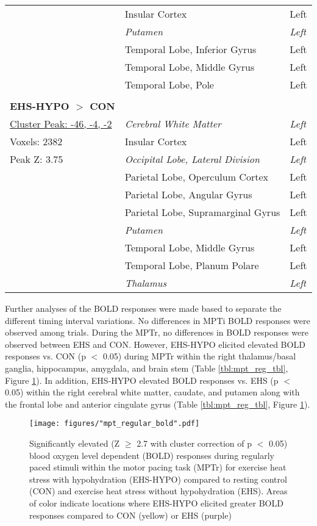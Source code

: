 \begin{table}
\begin{tabular}{lll}
		& Insular Cortex & Left \\
		& \textit{Putamen} & \textit{Left} \\
		& Temporal Lobe, Inferior Gyrus & Left \\
		& Temporal Lobe, Middle Gyrus & Left \\
		& Temporal Lobe, Pole & Left \\
		&& \\
		\textbf{EHS-HYPO ${>}$ CON} & & \\	
		\underline{Cluster Peak: -46, -4, -2} & \textit{Cerebral White Matter} & \textit{Left} \\
		Voxels: 2382 & Insular Cortex & Left \\
		Peak Z: 3.75 & \textit{Occipital Lobe, Lateral Division} & \textit{Left} \\
		& Parietal Lobe, Operculum Cortex & Left \\
		& Parietal Lobe, Angular Gyrus & Left \\ 
		& Parietal Lobe, Supramarginal Gyrus & Left \\
		& \textit{Putamen} & \textit{Left} \\
		& Temporal Lobe, Middle Gyrus & Left \\
		& Temporal Lobe, Planum Polare & Left \\
		& \textit{Thalamus} & \textit{Left} \\
		\hline		    
	\end{tabular}
	\label{tbl:mpt_entire_tbl}
\end{table}

Further analyses of the BOLD responses were made based to separate the different timing interval variations. No differences in MPTi BOLD responses were observed among trials. During the MPTr, no differences in BOLD responses were observed between EHS and CON. However, EHS-HYPO elicited elevated BOLD responses vs. CON (p ${<}$ 0.05) during MPTr within the right thalamus/basal ganglia, hippocampus, amygdala, and brain stem (Table \ref{tbl:mpt_reg_tbl}, Figure \ref{fig:mpt_regular_bold}). In addition, EHS-HYPO elevated BOLD responses vs. EHS (p ${<}$ 0.05) within the right cerebral white matter, caudate, and putamen along with the frontal lobe and anterior cingulate gyrus (Table \ref{tbl:mpt_reg_tbl}, Figure \ref{fig:mpt_regular_bold}). 

\begin{figure}
	\centering
	\texttt{[image: figures/"mpt\_regular\_bold".pdf]}
	\caption{Significantly elevated (Z ${\ge}$ 2.7 with cluster correction of p ${<}$ 0.05) blood oxygen level dependent (BOLD) responses during regularly paced stimuli within the motor pacing task (MPTr) for exercise heat stress with hypohydration (EHS-HYPO) compared to resting control (CON) and exercise heat stress without hypohydration (EHS). Areas of color indicate locations where EHS-HYPO elicited greater BOLD responses compared to CON (yellow) or EHS (purple)}
	\label{fig:mpt_regular_bold}	
\end{figure}

